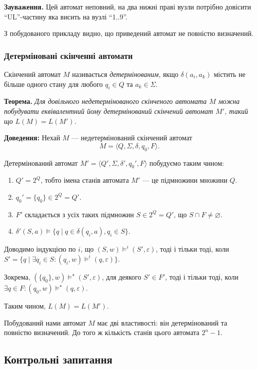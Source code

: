 \textbf{Зауваження.} Цей автомат неповний, на два нижні праві вузли потрібно довісити ``UL''-частину яка висить на вузлі ``1..9''. \medskip

З побудованого прикладу видно, що приведений автомат не повністю визначений.

\subsubsection{Детерміновані скінченні автомати}

Скінчений автомат $M$ називається \textit{детермінованим}, якщо $\delta(a_i, a_k)$ містить не більше одного стану для любого $q_i \in Q$ та $a_k \in \Sigma$. \medskip

\textbf{Теорема.} \textit{Для довільного недетермінованого скінченого автомата $M$ можна побудувати еквівалентний йому детермінований скінчений автомат $M'$, такий що $L(M) = L(M')$.} \medskip


\textbf{Доведення:} Нехай $M$ --- недетермінований скінчений автомат \[M = \langle Q, \Sigma, \delta, q_0, F\rangle. \]

Детермінований автомат $M' = \langle Q', \Sigma, \delta', q_0', F\rangle$ побудуємо таким чином:
\begin{enumerate}
	\item $Q' = 2^Q$, тобто імена станів автомата $M'$ --- це підмножини множини $Q$.
	\item $q_0' = \{q_0\} \in 2^Q = Q'$.
	\item $F'$ складається з усіх таких підмножин $S \in 2^Q = Q'$, що $S \cap F \ne \varnothing$.
	\item $\delta'(S, a) \models \{q \mid q \in \delta(q_i, a), q_i \in S\}$.
\end{enumerate}

Доводимо індукцією по $i$, що $(S, w) \models^i (S', \varepsilon)$, тоді і тільки тоді, коли $S' = \{q \mid \exists q_i \in S: (q_i, w) \models^i (q, \varepsilon)\}$. \medskip

Зокрема, $ (\{q_0\}, w) \models^\star (S', \varepsilon)$, для деякого $S' \in F'$, тоді і тільки тоді, коли $\exists q \in F: (q_0, w) \models^\star (q, \varepsilon)$. \medskip

Таким чином, $L(M) = L(M')$. \medskip

Побудований нами автомат $M$ має дві властивості: він детермінований та повністю визначений. До того ж кількість станів цього автомата $2^n - 1$.

\subsection{Контрольні запитання}

